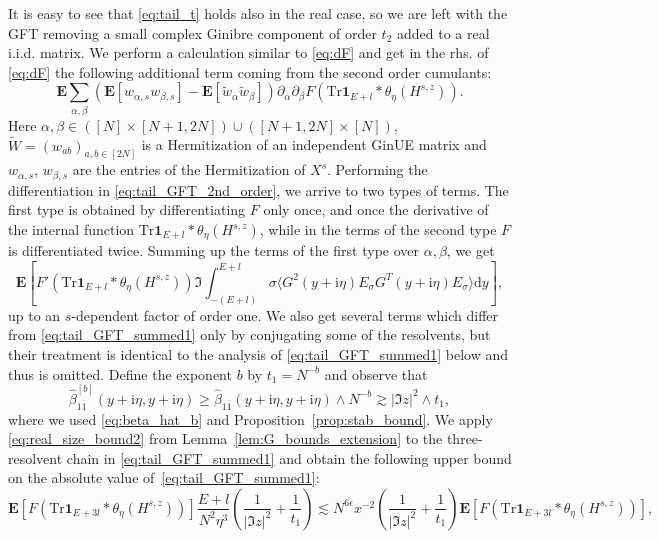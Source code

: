 \documentclass[10pt]{amsart}
\numberwithin{equation}{section}
\newcommand{\dif}{\mathrm{d}}
\newcommand{\E}{\mathbf{E}}
\newcommand{\ii}{\mathrm{i}}
\begin{document}
It is easy to see that \eqref{eq:tail_t} holds also in the real case, so we are left with the GFT removing a small complex Ginibre component of order $t_2$ added to a real i.i.d. matrix. We perform a calculation similar to \eqref{eq:dF} and get in the rhs. of \eqref{eq:dF} the following additional term coming from the second order cumulants:
\begin{equation}
\E\sum_{\alpha,\beta} \left(\E[w_{\alpha,s}w_{\beta,s}] - \E [\widetilde{w}_\alpha\widetilde{w}_\beta]\right)\partial_\alpha\partial_\beta F\left(\mathrm{Tr}\bm{1}_{E+l}*\theta_\eta(H^{s,z})\right).
\label{eq:tail_GFT_2nd_order}
\end{equation}
Here $\alpha,\beta\in ([N]\times [N+1,2N])\cup ([N+1,2N]\times [N])$, $\widetilde{W}=(w_{ab})_{a,b\in[2N]}$ is a Hermitization of an independent GinUE matrix and $w_{\alpha,s}$, $w_{\beta,s}$ are the entries of the Hermitization of $X^s$. Performing the differentiation in \eqref{eq:tail_GFT_2nd_order}, we arrive to two types of terms. The first type is obtained by differentiating $F$ only once, and once the derivative of the internal function $\mathrm{Tr}\bm{1}_{E+l}*\theta_\eta(H^{s,z})$, while in the terms of the second type $F$ is differentiated twice. Summing up the terms of the first type over $\alpha,\beta$, we get
\begin{equation}
\E\left[F'\left(\mathrm{Tr}\bm{1}_{E+l}*\theta_\eta(H^{s,z})\right) \Im \int_{-(E+l)}^{E+l} \sigma \langle G^2(y+\ii\eta)E_\sigma G^T(y+\ii\eta)E_\sigma\rangle\dif y\right],
\label{eq:tail_GFT_summed1}
\end{equation}
up to an $s$-dependent factor of order one. We also get several terms which differ from \eqref{eq:tail_GFT_summed1} only by conjugating some of the resolvents, but their treatment is identical to the analysis of \eqref{eq:tail_GFT_summed1} below and thus is omitted. Define the exponent $b$ by $t_1=N^{-b}$ and observe that
\begin{equation}
\widehat{\beta}_{1\overline{1}}^{[b]}(y+\ii\eta,y+\ii\eta) \ge  \widehat{\beta}_{1\overline{1}}(y+\ii\eta,y+\ii\eta)\wedge N^{-b}\gtrsim |\Im z|^2\wedge t_1,
\label{eq:real_beta}
\end{equation}
where we used \eqref{eq:beta_hat_b} and Proposition~\ref{prop:stab_bound}. We apply \eqref{eq:real_size_bound2} from Lemma~\ref{lem:G_bounds_extension} to the three-resolvent chain in \eqref{eq:tail_GFT_summed1} and obtain the following upper bound on the absolute value of~\eqref{eq:tail_GFT_summed1}:
\begin{equation}
\E\left[F\left(\mathrm{Tr}\bm{1}_{E+3l}*\theta_\eta(H^{s,z})\right)\right]\frac{E+l}{N^2\eta^3}\left(\frac{1}{|\Im z|^2}+\frac{1}{t_1}\right)\lesssim N^{6\epsilon} x^{-2}\!\!\left(\frac{1}{|\Im z|^2}\!+\!\frac{1}{t_1}\right)\E\left[F\left(\mathrm{Tr}\bm{1}_{E+3l}*\theta_\eta(H^{s,z})\right)\right],
\label{eq:tail_GFT_bound1}
\end{equation}
\end{document}
